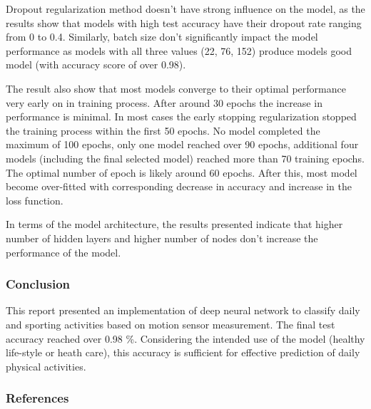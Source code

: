 \documentclass[]{article}
\begin{document}
Dropout regularization method doesn't have strong influence on the
model, as the results show that models with high test accuracy have
their dropout rate ranging from 0 to 0.4. Similarly, batch size don't
significantly impact the model performance as models with all three
values (22, 76, 152) produce models good model (with accuracy score of
over 0.98).

The result also show that most models converge to their optimal
performance very early on in training process. After around 30 epochs
the increase in performance is minimal. In most cases the early stopping
regularization stopped the training process within the first 50 epochs.
No model completed the maximum of 100 epochs, only one model reached
over 90 epochs, additional four models (including the final selected
model) reached more than 70 training epochs. The optimal number of epoch
is likely around 60 epochs. After this, most model become over-fitted
with corresponding decrease in accuracy and increase in the loss
function.

In terms of the model architecture, the results presented indicate that
higher number of hidden layers and higher number of nodes don't increase
the performance of the model.

\hypertarget{conclusion}{%
\subsubsection{Conclusion}\label{conclusion}}

This report presented an implementation of deep neural network to
classify daily and sporting activities based on motion sensor
measurement. The final test accuracy reached over 0.98 \%. Considering
the intended use of the model (healthy life-style or heath care), this
accuracy is sufficient for effective prediction of daily physical
activities.

\hypertarget{references}{%
\subsubsection{References}\label{references}}
\end{document}
